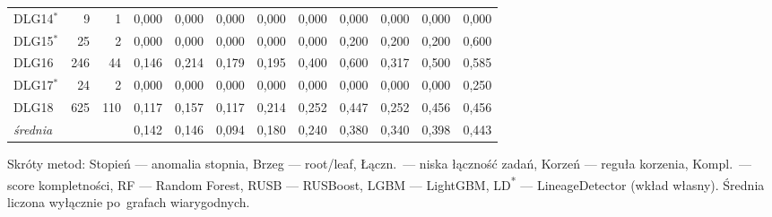 \begin{table}[ht]
\begin{tabular}{lrrccccccccc}
DLG14$^{*}$ & 9 & 1 & 0{,}000 & 0{,}000 & 0{,}000 & 0{,}000 & 0{,}000 & 0{,}000 & 0{,}000 & 0{,}000 & 0{,}000 \\
DLG15$^{*}$ & 25 & 2 & 0{,}000 & 0{,}000 & 0{,}000 & 0{,}000 & 0{,}000 & 0{,}200 & 0{,}200 & 0{,}200 & 0{,}600 \\
DLG16 & 246 & 44 & 0{,}146 & 0{,}214 & 0{,}179 & 0{,}195 & 0{,}400 & 0{,}600 & 0{,}317 & 0{,}500 & 0{,}585 \\
DLG17$^{*}$ & 24 & 2 & 0{,}000 & 0{,}000 & 0{,}000 & 0{,}000 & 0{,}000 & 0{,}000 & 0{,}000 & 0{,}000 & 0{,}250 \\
DLG18 & 625 & 110 & 0{,}117 & 0{,}157 & 0{,}117 & 0{,}214 & 0{,}252 & 0{,}447 & 0{,}252 & 0{,}456 & 0{,}456 \\
\midrule
\emph{średnia} & & & 0{,}142 & 0{,}146 & 0{,}094 & 0{,}180 & 0{,}240 & 0{,}380 & 0{,}340 & 0{,}398 & 0{,}443 \\
\bottomrule
\end{tabular}

\vspace{0.4em}
\footnotesize Skróty metod: Stopień — anomalia stopnia, Brzeg — root/leaf, Łączn.\ — niska łączność zadań, Korzeń — reguła korzenia, Kompl.\ — score kompletności, RF — Random Forest, RUSB — RUSBoost, LGBM — LightGBM, LD\textsuperscript{*} — LineageDetector (wkład własny). Średnia liczona wyłącznie po~grafach wiarygodnych.
\end{table}

\clearpage

